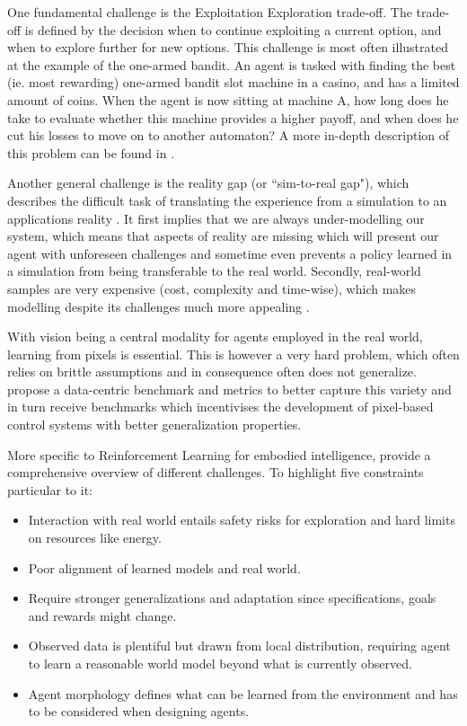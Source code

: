 \documentclass[twoside,11pt]{article}
\begin{document}
One fundamental challenge is the Exploitation Exploration trade-off. The trade-off is defined by the decision when to continue exploiting a current option, and when to explore further for new options. This challenge is most often illustrated at the example of the one-armed bandit. An agent is tasked with finding the best (ie. most rewarding) one-armed bandit slot machine in a casino, and has a limited amount of coins. When the agent is now sitting at machine A, how long does he take to evaluate whether this machine provides a higher payoff, and when does he cut his losses to move on to another automaton? A more in-depth description of this problem can be found in \citet{AudibertMunosSzepesv:2009:ExplorationExploitation}.

Another general challenge is the reality gap (or ``sim-to-real gap"), which describes the difficult task of translating the experience from a simulation to an applications reality \citep{ZagalJavierVallejos:2004:RealityGap}. It first implies that we are always under-modelling our system, which means that aspects of reality are missing which will present our agent with unforeseen challenges and sometime even prevents a policy learned in a simulation from being transferable to the real world. Secondly, real-world samples are very expensive (cost, complexity and time-wise), which makes modelling despite its challenges much more appealing  \cite{KoberBagnellPeters:2013:RLRoboticsSurvey}.

With vision being a central modality for agents employed in the real world, learning from pixels is essential. This is however a very hard problem, which often relies on brittle assumptions and in consequence often does not generalize. \citet{TomarEtAl:2021:LearnPixelControlRepresentations} propose a data-centric benchmark and metrics to better capture this variety and in turn receive benchmarks which incentivises the development of pixel-based control systems with better generalization properties. 


More specific to Reinforcement Learning for embodied intelligence, \cite{RoyEtAl:2021:RLRoboticsChallenges} provide a comprehensive overview of different challenges. To highlight five constraints particular to it:
\begin{itemize}
    \item Interaction with real world entails safety risks for exploration and hard limits on resources like energy.
    \item Poor alignment of learned models and real world.
    \item Require stronger generalizations  and adaptation since specifications, goals and rewards might change.
    \item Observed data is plentiful but drawn from local distribution, requiring agent to learn a reasonable world model beyond  what is currently observed. 
    \item Agent morphology defines what can be learned from the environment and has to be considered when designing agents.
\end{itemize}
\end{document}
